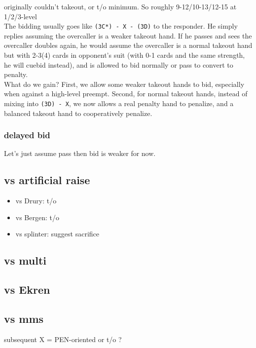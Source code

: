 {\small\ttfamily*originally couldn't takeout, or t/o minimum. So roughly 9-12/10-13/12-15 at 1/2/3-level} \\

The bidding usually goes like \texttt{(3C*) - X - (3D)} to the responder.
He simply replies assuming the overcaller is a weaker takeout hand.
If he passes and sees the overcaller doubles again, he would assume the overcaller is a normal takeout hand but with 2-3(4) cards in opponent's suit
(with 0-1 cards and the same strength, he will cuebid instead), and is allowed to bid normally or pass to convert to penalty. \\
What do we gain? First, we allow some weaker takeout hands to bid, especially when against a high-level preempt.
Second, for normal takeout hands, instead of mixing into \texttt{(3D) - X}, we now allows a real penalty hand to penalize, and a balanced takeout hand to cooperatively penalize.

\subsubsection{delayed bid}

Let's just assume pass then bid is weaker for now.

\subsection{vs artificial raise}

\begin{itemize}
    \setlength{\itemsep}{0pt}
    \item vs Drury: t/o
    \item vs Bergen: t/o
    \item vs splinter: suggest sacrifice
\end{itemize}

\subsection{vs multi}



\subsection{vs Ekren}



\subsection{vs mms}

subsequent X = PEN-oriented or t/o ?


